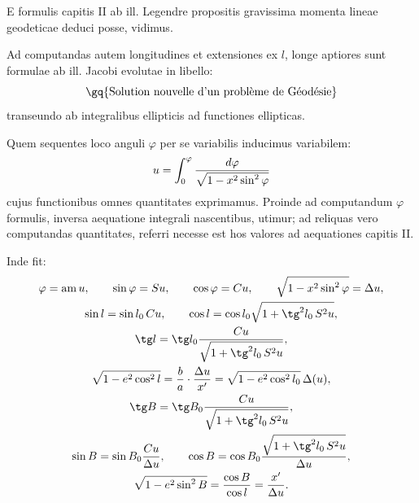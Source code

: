 \begingroup\small
{}

E formulis capitis II ab ill. Legendre propositis gravissima momenta lineae geodeticae deduci posse, vidimus.

Ad computandas autem longitudines et extensiones ex $l$, longe aptiores sunt formulae ab ill. Jacobi evolutae in libello:
\[
\text{\gq{Solution nouvelle d'un problème de Géodésie}}
\]
transeundo ab integralibus ellipticis ad functiones ellipticas.


Quem sequentes loco anguli $\varphi$ per se variabilis inducimus variabilem:
\[
 u=\int_0^\varphi {d\varphi\over \sqrt{1-x^2\sin^2\varphi}}
\]
cujus functionibus omnes quantitates exprimamus. Proinde ad computandum $\varphi$ formulis, inversa aequatione integrali nascentibus, utimur; ad reliquas vero computandas quantitates, referri necesse est hos valores ad aequationes capitis II.

Inde fit:
\[
\begin{gathered}
 \varphi=\operatorname{am}u,\qquad \sin\varphi=Su,
 \qquad \cos\varphi=Cu,\qquad \sqrt{1-x^2\sin^2\varphi}=\Delta u,\\
 \sin l=\sin l_0\,Cu,\qquad
 \cos l=\cos l_0\sqrt{1+\tg^2 l_0\,S^2u},\\
 \tg l=\tg l_0{Cu\over \sqrt{1+\tg^2l_0\,S^2u}},\\
 \sqrt{1-e^2\cos^2l}={b\over a}\cdot {\Delta u\over x'}
 =\sqrt{1-e^2\cos^2l_0}\,\Delta(u),\\
 \tg B=\tg B_0{Cu\over \sqrt{1+\tg^2l_0\,S^2u}},\\
 \sin B=\sin B_0{Cu\over \Delta u},
 \qquad
 \cos B=\cos B_0{\sqrt{1+\tg^2l_0\,S^2u}\over \Delta u},\\
 \sqrt{1-e^2\sin^2B}={\cos B\over \cos l}={x'\over \Delta u}.
\end{gathered}
\]
\endgroup
